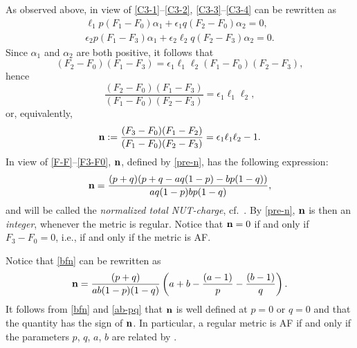 \documentclass[pdftex]{sigma}
\numberwithin{equation}{section}
\begin{document}
As observed above, in view of \eqref{C3-1}--\eqref{C3-2}, \eqref{C3-3}--\eqref{C3-4} can be rewritten as
\begin{gather} \ell _1 p (F_1 - F_0) \alpha _1 + \epsilon _1 q (F_2 - F_0) \alpha _2= 0, \label{C3-3bis}\\
\epsilon _2 p (F_1 - F_3) \alpha _1 + \epsilon _2 \ell _2 q (F_2 - F_3) \alpha _2 = 0. \label{C3-4bis}
\end{gather}
Since $\alpha _1$ and $\alpha _2$ are both positive, it follows that
\[(F_2 - F_0) (F_1 - F_3) = \epsilon _1 \ell _1 \ell _2 (F_1 - F_0) (F_2 - F_3), \]
hence
\[ \frac{(F_2 - F_0) (F_1 - F_3)}{(F_1 - F _0) (F _2 - F_3)} = \epsilon _1 \ell _1 \ell _2, \]
or, equivalently,
\begin{gather} \label{pre-n} {\bf n} := \frac{(F_3 - F_0) (F_1 - F_2)}{(F_1 - F _0) (F _2 - F_3)} = \epsilon _1 \ell _1 \ell _2 - 1. \end{gather}
In view of \eqref{F-F}--\eqref{F3-F0}, ${\bf n}$, defined by \eqref{pre-n}, has the following expression:
\begin{gather} \label{bfn} {\bf n} = \frac{(p + q) (p + q - a q (1 - p) - b p (1 - q))}{a q (1 - p) b p (1 - q)}, \end{gather}
and will be called the {\it normalized total NUT-charge}, cf.\ \cite[Section~III.B]{CT3}. By \eqref{pre-n}, ${\bf n}$ is then an {\it integer}, whenever the metric is regular. Notice that ${\bf n} = 0$ if and only if $F _3 - F _0 = 0$, i.e., if and only if the metric is AF.
\begin{rem} \label{rem-ab} {\rm Notice that \eqref{bfn} can be rewritten as
\[{\bf n} = \frac{(p + q)}{a b (1 - p) (1 - q)} \left(a + b - \frac{(a - 1)}{p} - \frac{(b - 1)}{q}\right).\]
 It follows from \eqref{bfn} and \eqref{ab-pq} that ${\bf n}$ is well defined at $p = 0$ or $q = 0$ and that the quantity  has the sign of ${\bf n}$. In particular, a regular metric is AF if and only if the parameters $p$, $q$, $a$, $b$ are related by .
} \end{rem}
\end{document}
